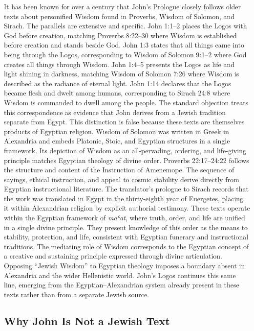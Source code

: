 It has been known for over a century that John's Prologue closely follows older texts about personified Wisdom found in Proverbs, Wisdom of Solomon, and Sirach.
The parallels are extensive and specific.
John 1:1--2 places the Logos with God before creation, matching Proverbs 8:22--30 where Wisdom is established before creation and stands beside God.
John 1:3 states that all things came into being through the Logos, corresponding to Wisdom of Solomon 9:1--2 where God creates all things through Wisdom.
John 1:4--5 presents the Logos as life and light shining in darkness, matching Wisdom of Solomon 7:26 where Wisdom is described as the radiance of eternal light.
John 1:14 declares that the Logos became flesh and dwelt among humans, corresponding to Sirach 24:8 where Wisdom is commanded to dwell among the people.
The standard objection treats this correspondence as evidence that John derives from a Jewish tradition separate from Egypt.
This distinction is false because these texts are themselves products of Egyptian religion.
Wisdom of Solomon was written in Greek in Alexandria and embeds Platonic, Stoic, and Egyptian structures in a single framework.
Its depiction of Wisdom as an all-pervading, ordering, and life-giving principle matches Egyptian theology of divine order.
Proverbs 22:17--24:22 follows the structure and content of the Instruction of Amenemope.
The sequence of sayings, ethical instruction, and appeal to cosmic stability derive directly from Egyptian instructional literature.
The translator's prologue to Sirach records that the work was translated in Egypt in the thirty-eighth year of Euergetes, placing it within Alexandrian religion by explicit authorial testimony.
These texts operate within the Egyptian framework of \emph{maʿat}, where truth, order, and life are unified in a single divine principle.
They present knowledge of this order as the means to stability, protection, and life, consistent with Egyptian funerary and instructional traditions.
The mediating role of Wisdom corresponds to the Egyptian concept of a creative and sustaining principle expressed through divine articulation.
Opposing ``Jewish Wisdom'' to Egyptian theology imposes a boundary absent in Alexandria and the wider Hellenistic world.
John's Logos continues this same line, emerging from the Egyptian--Alexandrian system already present in these texts rather than from a separate Jewish source.

\subsection{Why John Is Not a Jewish Text}

